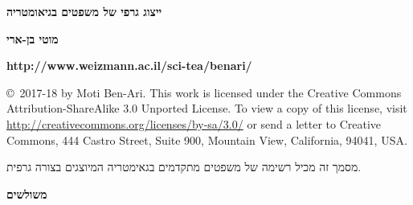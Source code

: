 \documentclass[12pt,a4paper]{article}
\begin{document}
\thispagestyle{empty}

\begin{center}
\textbf{\Large ייצוג גרפי של משפטים בגיאומטריה}

\bigskip

\textbf{\large מוטי בן-ארי}

\bigskip

\textbf{\sffamily \large http://www.weizmann.ac.il/sci-tea/benari/}
\end{center}

\bigskip


\begin{scriptsize}
\copyright{}\  2017-18 by Moti Ben-Ari. This work is licensed under the Creative Commons Attribution-ShareAlike 3.0 Unported License. To view a copy of this license, visit \url{http://creativecommons.org/licenses/by-sa/3.0/} or send a letter to Creative Commons, 444 Castro Street, Suite 900, Mountain View, California, 94041, USA.
\end{scriptsize}


\bigskip


מסמך זה מכיל רשימה של משפטים מתקדמים בגאימטריה המיוצגים בצורה גרפית.

\begin{center}
\large\sffamily\bfseries משולשים
\end{center}
\end{document}
